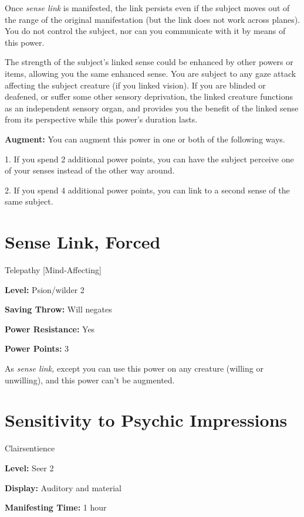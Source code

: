 \documentclass{article}
\begin{document}
Once \textit{sense link }is manifested, the link persists even if the subject moves 
out of the range of the original manifestation (but the link does not work across 
planes). You do not control the subject, nor can you communicate with it by means 
of this power.

The strength of the subject's linked sense could be enhanced by other powers or 
items, allowing you the same enhanced sense. You are subject to any gaze attack 
affecting the subject creature (if you linked vision). If you are blinded or deafened, 
or suffer some other sensory deprivation, the linked creature functions as an independent 
sensory organ, and provides you the benefit of the linked sense from its perspective 
while this power's duration lasts.

\textbf{Augment:} You can augment this power in one or both of the following ways.

1. If you spend 2 additional power points, you can have the subject perceive one 
of your senses instead of the other way around.

2. If you spend 4 additional power points, you can link to a second sense of the 
same subject.

\vspace{12pt}
\section*{Sense Link, Forced}

Telepathy [Mind-Affecting]

\textbf{Level:} Psion/wilder 2

\textbf{Saving Throw:} Will negates

\textbf{Power Resistance:} Yes

\textbf{Power Points:} 3

As \textit{sense link, }except you can use this power on any creature (willing 
or unwilling), and this power can't be augmented.

\vspace{12pt}
\section*{Sensitivity to Psychic Impressions}

Clairsentience

\textbf{Level:} Seer 2

\textbf{Display:} Auditory and material

\textbf{Manifesting Time:} 1 hour
\end{document}
